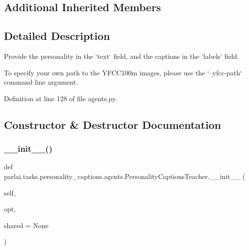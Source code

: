 \subsection*{Additional Inherited Members}


\subsection{Detailed Description}
\begin{DoxyVerb}Provide the personality in the `text` field, and the captions in the `labels` field.

To specify your own path to the YFCC100m images, please use the
`--yfcc-path` command line argument.
\end{DoxyVerb}
 

Definition at line 128 of file agents.\+py.



\subsection{Constructor \& Destructor Documentation}
\mbox{\label{classparlai_1_1tasks_1_1personality__captions_1_1agents_1_1PersonalityCaptionsTeacher_a629424710e209cb59e97404a313a97a8}} 
\subsubsection{\texorpdfstring{\+\_\+\+\_\+init\+\_\+\+\_\+()}{\_\_init\_\_()}}
{\footnotesize\ttfamily def parlai.\+tasks.\+personality\+\_\+captions.\+agents.\+Personality\+Captions\+Teacher.\+\_\+\+\_\+init\+\_\+\+\_\+ (\begin{DoxyParamCaption}\item[{}]{self,  }\item[{}]{opt,  }\item[{}]{shared = {\ttfamily None} }\end{DoxyParamCaption})}



